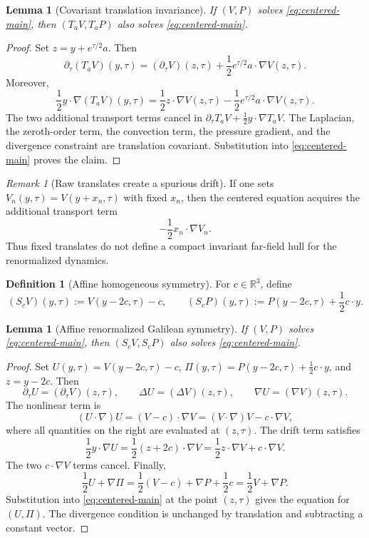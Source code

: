 \documentclass[11pt]{amsart}
\numberwithin{equation}{section}
\theoremstyle{plain}
\newtheorem{lemma}[theorem]{Lemma}
\theoremstyle{definition}
\newtheorem{definition}[theorem]{Definition}
\theoremstyle{remark}
\newtheorem{remark}[theorem]{Remark}
\newcommand{\R}{\mathbb R}
\begin{document}
\begin{lemma}[Covariant translation invariance]
\label{lem:covariant-translation-invariance}
If \((V,P)\) solves \eqref{eq:centered-main}, then
\((T_aV,T_aP)\) also solves \eqref{eq:centered-main}.
\end{lemma}

\begin{proof}
Set \(z=y+e^{\tau/2}a\).  Then
\[
   \partial_\tau(T_aV)(y,\tau)
   =
   (\partial_\tau V)(z,\tau)
   +\frac12e^{\tau/2}a\cdot\nabla V(z,\tau).
\]
Moreover,
\[
   \frac12 y\cdot\nabla(T_aV)(y,\tau)
   =
   \frac12 z\cdot\nabla V(z,\tau)
   -\frac12e^{\tau/2}a\cdot\nabla V(z,\tau).
\]
The two additional transport terms cancel in
\(\partial_\tau T_aV+\frac12y\cdot\nabla T_aV\).  The Laplacian, the
zeroth-order term, the convection term, the pressure gradient, and the
divergence constraint are translation covariant.  Substitution into
\eqref{eq:centered-main} proves the claim.
\end{proof}

\begin{remark}[Raw translates create a spurious drift]
\label{rem:raw-translates}
If one sets \(V_n(y,\tau)=V(y+x_n,\tau)\) with fixed \(x_n\), then the centered
equation acquires the additional transport term
\[
   -\frac12 x_n\cdot\nabla V_n .
\]
Thus fixed translates do not define a compact invariant far-field hull for the
renormalized dynamics.
\end{remark}

\begin{definition}[Affine homogeneous symmetry]
\label{def:affine-symmetry}
For \(c\in\R^3\), define
\[
   (S_cV)(y,\tau):=V(y-2c,\tau)-c,
   \qquad
   (S_cP)(y,\tau):=P(y-2c,\tau)+\frac12 c\cdot y .
\]
\end{definition}

\begin{lemma}[Affine renormalized Galilean symmetry]
\label{lem:affine-symmetry}
If \((V,P)\) solves \eqref{eq:centered-main}, then
\((S_cV,S_cP)\) also solves \eqref{eq:centered-main}.
\end{lemma}

\begin{proof}
Set \(U(y,\tau)=V(y-2c,\tau)-c\),
\(\Pi(y,\tau)=P(y-2c,\tau)+\frac12c\cdot y\), and \(z=y-2c\).  Then
\[
   \partial_\tau U=(\partial_\tau V)(z,\tau),
   \qquad \Delta U=(\Delta V)(z,\tau),
   \qquad \nabla U=(\nabla V)(z,\tau).
\]
The nonlinear term is
\[
   (U\cdot\nabla)U=(V-c)\cdot\nabla V
   =(V\cdot\nabla)V-c\cdot\nabla V,
\]
where all quantities on the right are evaluated at \((z,\tau)\).  The drift
term satisfies
\[
   \frac12 y\cdot\nabla U
   =\frac12(z+2c)\cdot\nabla V
   =\frac12z\cdot\nabla V+c\cdot\nabla V.
\]
The two \(c\cdot\nabla V\) terms cancel.  Finally,
\[
   \frac12U+\nabla\Pi
   =
   \frac12(V-c)+\nabla P+\frac12c
   =
   \frac12V+\nabla P.
\]
Substitution into \eqref{eq:centered-main} at the point \((z,\tau)\) gives the
equation for \((U,\Pi)\).  The divergence condition is unchanged by translation
and subtracting a constant vector.
\end{proof}
\end{document}
